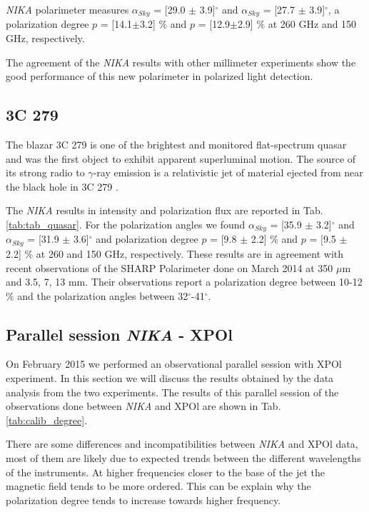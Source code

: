 \documentclass[twocolumn,traditabstract]{aa}
\begin{document}
{\it NIKA} polarimeter measures $\alpha_{Sky}$ = [29.0 $\pm$ 3.9]$^\circ$ and $\alpha_{Sky}$ = [27.7 $\pm$ 3.9]$^\circ$, a polarization degree $p$ = [14.1$\pm$3.2] $\%$ and $p$ = [12.9$\pm$2.9] $\%$ at 260 GHz and 150 GHz, respectively.

The agreement of the {\it NIKA} results with other millimeter experiments show the good performance of this new polarimeter in polarized light detection. 

\subsection{3C 279}
The blazar 3C 279 is one of the brightest and monitored flat-spectrum quasar and was the first object to exhibit apparent superluminal motion. The source of its strong radio to $\gamma$-ray emission  is  a  relativistic  jet  of  material  ejected  from  near  the black  hole  in  3C  279 \citep{apex3c279}.  

The {\it NIKA} results in intensity and polarization flux are reported in Tab. \ref{tab:tab_quasar}. For the polarization angles we found $\alpha_{Sky}$ = [35.9 $\pm$ 3.2]$^\circ$ and $\alpha_{Sky}$ = [31.9 $\pm$ 3.6]$^\circ$ and polarization degree $p$ = [9.8 $\pm$ 2.2] $\%$ and $p$ = [9.5 $\pm$ 2.2] $\%$ at 260 and 150 GHz, respectively. 
These results are in agreement with recent observations of the SHARP Polarimeter \citep{sharp3c279} done on March 2014 at 350 $\mu$m and 3.5, 7, 13 mm. Their observations report a polarization degree between 10-12 $\%$  and the polarization angles  between 32$^\circ$-41$^\circ$.


\subsection{Parallel session {\it NIKA} - XPOl}
On February 2015 we performed an observational parallel session with XPOl experiment. In this section we will discuss the results obtained by the data analysis from the two experiments. 
The results of this parallel session of the observations done between {\it NIKA} and XPOl are shown in Tab. \ref{tab:calib_degree}. 

There are some differences and incompatibilities between {\it NIKA} and XPOl data, most of them are likely due to expected trends between the different wavelengths of the instruments. At higher frequencies closer to the base of the jet the magnetic field tends to be more ordered. This can be explain why the polarization degree tends to increase towards higher frequency. 
\end{document}
